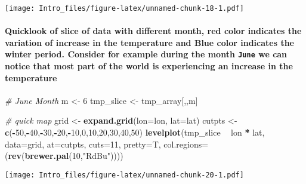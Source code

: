 \documentclass[]{article}
\newenvironment{Shaded}{\begin{snugshade}}{\end{snugshade}}
\newcommand{\KeywordTok}[1]{\textcolor[rgb]{0.13,0.29,0.53}{\textbf{#1}}}
\newcommand{\DataTypeTok}[1]{\textcolor[rgb]{0.13,0.29,0.53}{#1}}
\newcommand{\DecValTok}[1]{\textcolor[rgb]{0.00,0.00,0.81}{#1}}
\newcommand{\StringTok}[1]{\textcolor[rgb]{0.31,0.60,0.02}{#1}}
\newcommand{\CommentTok}[1]{\textcolor[rgb]{0.56,0.35,0.01}{\textit{#1}}}
\newcommand{\OperatorTok}[1]{\textcolor[rgb]{0.81,0.36,0.00}{\textbf{#1}}}
\newcommand{\NormalTok}[1]{#1}
\let\oldparagraph\paragraph
\renewcommand{\paragraph}[1]{\oldparagraph{#1}\mbox{}}
\begin{document}
\texttt{[image: Intro\_files/figure-latex/unnamed-chunk-18-1.pdf]}

\paragraph{\texorpdfstring{Quicklook of slice of data with different
month, red color indicates the variation of increase in the temperature
and Blue color indicates the winter period. Consider for example during
the month \texttt{June} we can notice that most part of the world is
experiencing an increase in the
temperature}{Quicklook of slice of data with different month, red color indicates the variation of increase in the temperature and Blue color indicates the winter period. Consider for example during the month June we can notice that most part of the world is experiencing an increase in the temperature}}\label{quicklook-of-slice-of-data-with-different-month-red-color-indicates-the-variation-of-increase-in-the-temperature-and-blue-color-indicates-the-winter-period.-consider-for-example-during-the-month-june-we-can-notice-that-most-part-of-the-world-is-experiencing-an-increase-in-the-temperature}

\begin{Shaded}
\begin{Highlighting}[]
\CommentTok{# June Month}
\NormalTok{m <-}\StringTok{ }\DecValTok{6}
\NormalTok{tmp_slice <-}\StringTok{ }\NormalTok{tmp_array[,,m]}
\end{Highlighting}
\end{Shaded}

\begin{Shaded}
\begin{Highlighting}[]
\CommentTok{# quick map}
\NormalTok{grid <-}\StringTok{ }\KeywordTok{expand.grid}\NormalTok{(}\DataTypeTok{lon=}\NormalTok{lon, }\DataTypeTok{lat=}\NormalTok{lat)}
\NormalTok{cutpts <-}\StringTok{ }\KeywordTok{c}\NormalTok{(}\OperatorTok{-}\DecValTok{50}\NormalTok{,}\OperatorTok{-}\DecValTok{40}\NormalTok{,}\OperatorTok{-}\DecValTok{30}\NormalTok{,}\OperatorTok{-}\DecValTok{20}\NormalTok{,}\OperatorTok{-}\DecValTok{10}\NormalTok{,}\DecValTok{0}\NormalTok{,}\DecValTok{10}\NormalTok{,}\DecValTok{20}\NormalTok{,}\DecValTok{30}\NormalTok{,}\DecValTok{40}\NormalTok{,}\DecValTok{50}\NormalTok{)}
\KeywordTok{levelplot}\NormalTok{(tmp_slice }\OperatorTok{~}\StringTok{ }\NormalTok{lon }\OperatorTok{*}\StringTok{ }\NormalTok{lat, }\DataTypeTok{data=}\NormalTok{grid, }\DataTypeTok{at=}\NormalTok{cutpts, }\DataTypeTok{cuts=}\DecValTok{11}\NormalTok{, }\DataTypeTok{pretty=}\NormalTok{T, }
  \DataTypeTok{col.regions=}\NormalTok{(}\KeywordTok{rev}\NormalTok{(}\KeywordTok{brewer.pal}\NormalTok{(}\DecValTok{10}\NormalTok{,}\StringTok{"RdBu"}\NormalTok{))))}
\end{Highlighting}
\end{Shaded}

\texttt{[image: Intro\_files/figure-latex/unnamed-chunk-20-1.pdf]}
\end{document}
